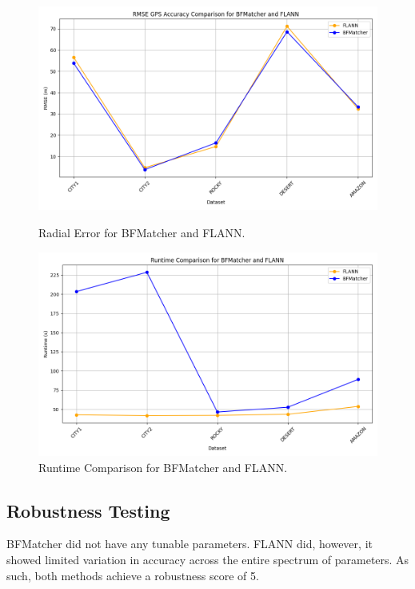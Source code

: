 \begin{figure}[H]
    \centering
    \begin{minipage}{0.45\textwidth}
        \centering
        \includegraphics[width=\textwidth]{./Chapter 4/testresults/rmse_flann_bf.png}
        \caption{Radial Error for BFMatcher and FLANN.}
        \label{fig:rmse_flann_bf}
    \end{minipage}\hfill
    \begin{minipage}{0.45\textwidth}
        \centering
        \includegraphics[width=\textwidth]{./Chapter 4/testresults/runtime_flann_bf.png}
        \caption{Runtime Comparison for BFMatcher and FLANN.}
        \label{fig:runtime_flann_bf}
    \end{minipage}
\end{figure}



\subsection{Robustness Testing}
BFMatcher did not have any tunable parameters. FLANN did, however, it showed limited variation in accuracy across the entire spectrum of parameters. As such, both methods achieve a robustness score of 5.

